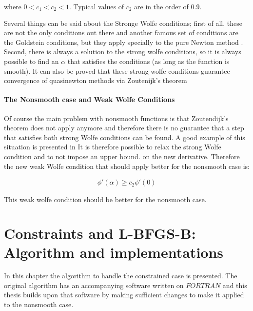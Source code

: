 where $0 < c_1 < c_2 < 1$.  Typical values of $c_2$ are in the order of $0.9$.

Several things can be said about the Stronge Wolfe conditions; first of all, these are not the only conditions out there and another famous set of conditions are the Goldstein conditions, but they apply specially to the pure Newton method \citep{nocedal}.  Second, there is always a solution to the strong wolfe conditions, so it is always possible to find an $\alpha$ that satisfies the conditions (as long as the function is smooth).  It can also be proved that these strong wolfe conditions guarantee convergence of quasinewton methods via Zoutenijk's theorem \citep{zoutendijk}

\subsubsection{The Nonsmooth case and Weak Wolfe Conditions}

Of course the main problem with nonsmooth functions is that Zoutendijk's theorem does not apply anymore and therefore there is no guarantee that a step that satisfies both strong Wolfe conditions can be found.  A good example of this situation is presented in \citep{skaaja}  It is therefore possible to relax the strong Wolfe condition and to not impose an upper bound.  on the new derivative.  Therefore the new weak Wolfe condition that should apply better for the nonsmooth case is: 

\begin{equation} \label{weakWolfe}
  \begin{aligned}
    \phi'(\alpha) \geq c_2\phi'(0)
  \end{aligned}
\end{equation}

This weak wolfe condition should be better for the nonsmooth case.

\chapter{Constraints and L-BFGS-B: Algorithm and implementations}
\label{ChapterConstraints} %

In this chapter the algorithm to handle the constrained case is presented.  The original algorithm \citep{mainpaper} has an accompanying software written on $FORTRAN$ and this thesis builds upon that software by making sufficient changes to make it applied to the nonsmooth case.

